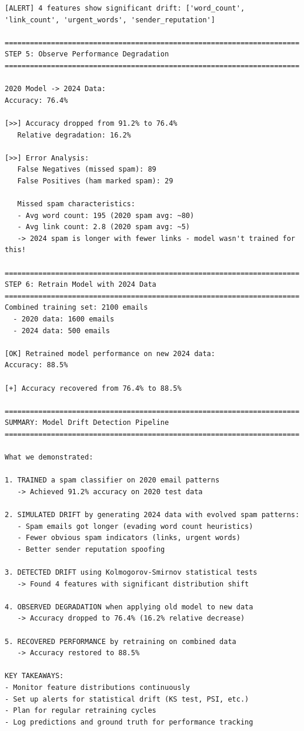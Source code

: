 \begin{lstlisting}
[ALERT] 4 features show significant drift: ['word_count', 'link_count', 'urgent_words', 'sender_reputation']

======================================================================
STEP 5: Observe Performance Degradation
======================================================================

2020 Model -> 2024 Data:
Accuracy: 76.4%

[>>] Accuracy dropped from 91.2% to 76.4%
   Relative degradation: 16.2%

[>>] Error Analysis:
   False Negatives (missed spam): 89
   False Positives (ham marked spam): 29

   Missed spam characteristics:
   - Avg word count: 195 (2020 spam avg: ~80)
   - Avg link count: 2.8 (2020 spam avg: ~5)
   -> 2024 spam is longer with fewer links - model wasn't trained for this!

======================================================================
STEP 6: Retrain Model with 2024 Data
======================================================================
Combined training set: 2100 emails
  - 2020 data: 1600 emails
  - 2024 data: 500 emails

[OK] Retrained model performance on new 2024 data:
Accuracy: 88.5%

[+] Accuracy recovered from 76.4% to 88.5%

======================================================================
SUMMARY: Model Drift Detection Pipeline
======================================================================

What we demonstrated:

1. TRAINED a spam classifier on 2020 email patterns
   -> Achieved 91.2% accuracy on 2020 test data

2. SIMULATED DRIFT by generating 2024 data with evolved spam patterns:
   - Spam emails got longer (evading word count heuristics)
   - Fewer obvious spam indicators (links, urgent words)
   - Better sender reputation spoofing

3. DETECTED DRIFT using Kolmogorov-Smirnov statistical tests
   -> Found 4 features with significant distribution shift

4. OBSERVED DEGRADATION when applying old model to new data
   -> Accuracy dropped to 76.4% (16.2% relative decrease)

5. RECOVERED PERFORMANCE by retraining on combined data
   -> Accuracy restored to 88.5%

KEY TAKEAWAYS:
- Monitor feature distributions continuously
- Set up alerts for statistical drift (KS test, PSI, etc.)
- Plan for regular retraining cycles
- Log predictions and ground truth for performance tracking
\end{lstlisting}

